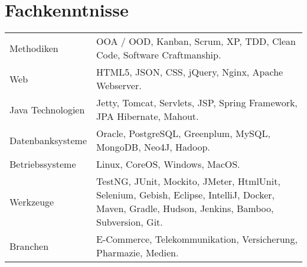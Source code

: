 \section*{Fachkenntnisse}
\begin{longtable}{@{}p{6cm}p{10cm}}
Methodiken	        & OOA / OOD, Kanban, Scrum, XP, TDD, Clean Code, Software Craftmanship.\\
Web         	    & HTML5, JSON, CSS, jQuery, Nginx, Apache Webserver.\\
Java Technologien	& Jetty, Tomcat, Servlets, JSP, Spring Framework, JPA Hibernate, Mahout.\\
Datenbanksysteme	& Oracle, PostgreSQL, Greenplum, MySQL, MongoDB, Neo4J, Hadoop.\\
Betriebssysteme	    & Linux, CoreOS, Windows, MacOS.\\
Werkzeuge		    & TestNG, JUnit, Mockito, JMeter, HtmlUnit, Selenium, Gebish, Eclipse, IntelliJ, Docker, Maven, Gradle, Hudson, Jenkins, Bamboo, Subversion, Git.\\
Branchen		    & E-Commerce, Telekommunikation, Versicherung, Pharmazie, Medien.\\
\end{longtable}
